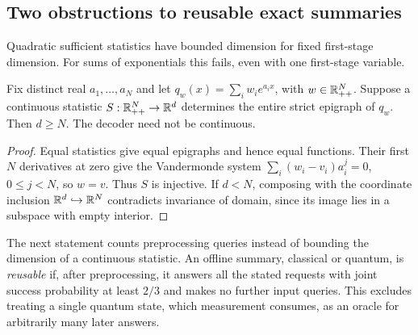 \subsection{Two obstructions to reusable exact summaries}

Quadratic sufficient statistics have bounded dimension for fixed
first-stage dimension.  For sums of exponentials this fails,
even with one first-stage variable.

\begin{proposition}\label{prop:projected-exp-summary}
Fix distinct real $a_1,\ldots,a_N$ and let
$q_w(x)=\sum_i w_i e^{a_ix}$, with $w\in\mathbb R_{++}^N$.
Suppose a continuous statistic $S:\mathbb R_{++}^N\to\mathbb R^d$ determines the entire
strict epigraph of $q_w$.  Then $d\geq N$.  The decoder need not be
continuous.
\end{proposition}
\begin{proof}
Equal statistics give equal epigraphs and hence equal functions.  Their
first $N$ derivatives at zero give the Vandermonde system
$\sum_i(w_i-v_i)a_i^j=0$, $0\leq j<N$, so $w=v$.
Thus $S$ is injective.  If $d<N$, composing with the coordinate inclusion
$\mathbb R^d\hookrightarrow\mathbb R^N$ contradicts invariance of domain, since its
image lies in a subspace with empty interior.
\end{proof}

The next statement counts preprocessing queries instead of bounding the
dimension of a continuous statistic.  An offline summary, classical or
quantum, is \emph{reusable} if, after preprocessing, it answers all the
stated requests with joint success probability at least $2/3$ and makes
no further input queries.  This excludes treating a single quantum state,
which measurement consumes, as an oracle for arbitrarily many later
answers.

